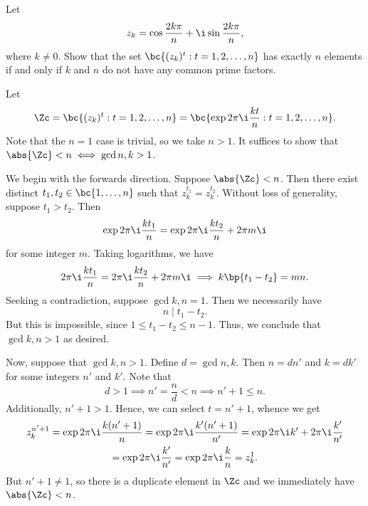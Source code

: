 \begin{solution}
\begin{center}
    \end{center}
\end{solution}

\begin{problem}
    Let \[z_k = \cos{\frac{2k\pi}{n}} + \i \sin{\frac{2k\pi}{n}},\] where $k \neq 0$. Show that the set $\bc{(z_k)^t : t = 1, 2, \dots, n}$ has exactly $n$ elements if and only if $k$ and $n$ do not have any common prime factors.
\end{problem}
\begin{solution}
    Let \[\Zc = \bc{(z_k)^t : t = 1, 2, \dots, n} = \bc{\exp{2\pi\i\frac{kt}{n}} : t = 1, 2, \dots, n}.\] Note that the $n = 1$ case is trivial, so we take $n > 1$. It suffices to show that $\abs{\Zc} < n \iff \gcd{n, k} > 1$.

    We begin with the forwards direction. Suppose $\abs{\Zc} < n$. Then there exist distinct $t_1, t_2 \in \bc{1, \dots, n}$ such that $z_k^{t_1} = z_k^{t_2}$. Without loss of generality, suppose $t_1 > t_2$. Then \[\exp{2\pi\i\frac{kt_1}{n}} = \exp{2\pi\i\frac{kt_2}{n} + 2\pi m \i}\] for some integer $m$. Taking logarithms, we have \[2\pi \i \frac{kt_1}{n} = 2\pi \i \frac{kt_2}{n} + 2\pi m \i \implies k\bp{t_1 - t_2} = mn.\] Seeking a contradiction, suppose $\gcd{k, n} = 1$. Then we necessarily have \[n \mid t_1 - t_2.\] But this is impossible, since $1 \leq t_1 - t_2 \leq n-1$. Thus, we conclude that $\gcd{k, n} > 1$ as desired.

    Now, suppose that $\gcd{k, n} > 1$. Define $d = \gcd{n, k}$. Then $n = dn'$ and $k = dk'$ for some integers $n'$ and $k'$. Note that \[d > 1 \implies n' = \frac{n}{d} < n \implies n' + 1 \leq n.\] Additionally, $n' + 1 > 1$. Hence, we can select $t = n' + 1$, whence we get
    \begin{gather*}
        z_k^{n' + 1} = \exp{2\pi \i \frac{k (n' + 1)}{n}} = \exp{2\pi \i \frac{k' (n' + 1)}{n'}} = \exp{2\pi \i k' + 2\pi\i\frac{k'}{n'}}\\
        = \exp{2\pi \i \frac{k'}{n'}} = \exp{2\pi \i \frac{k}{n}} = z_k^{1}.
    \end{gather*}
    But $n' + 1 \neq 1$, so there is a duplicate element in $\Zc$ and we immediately have $\abs{\Zc} < n$.
\end{solution}

